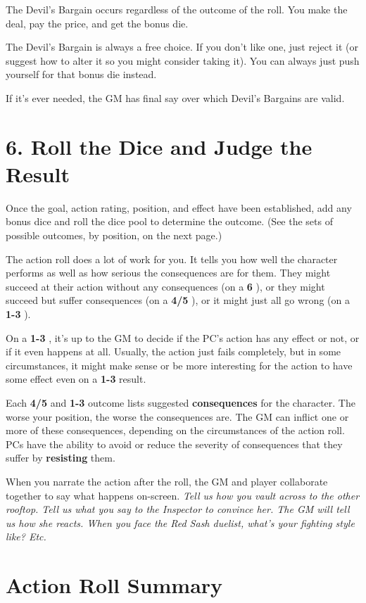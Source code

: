 \documentclass[11pt,oneside]{book}
\newcommand{\gameterm}[1]{\textbf{#1}}
\begin{document}
The Devil’s Bargain occurs regardless of the outcome of the roll. You make the deal, pay the price, and get the bonus die.

The Devil’s Bargain is always a free choice. If you don’t like one, just reject it (or suggest how to alter it so you might consider taking it). You can always just push yourself for that bonus die instead.

If it’s ever needed, the GM has final say over which Devil’s Bargains are valid.

\section{6. Roll the Dice and Judge the Result}

Once the goal, action rating, position, and effect have been established, add any bonus dice and roll the dice pool to determine the outcome. (See the sets of possible outcomes, by position, on the next page.)

The action roll does a lot of work for you. It tells you how well the character performs as well as how serious the consequences are for them. They might succeed at their action without any consequences (on a \gameterm{6} ), or they might succeed but suffer consequences (on a \gameterm{4/5} ), or it might just all go wrong (on a \gameterm{1-3} ).

On a \gameterm{1-3} , it’s up to the GM to decide if the PC’s action has any effect or not, or if it even happens at all. Usually, the action just fails completely, but in some circumstances, it might make sense or be more interesting for the action to have some effect even on a \gameterm{1-3}  result.

Each \gameterm{4/5}  and \gameterm{1-3}  outcome lists suggested \textbf{consequences} for the character. The worse your position, the worse the consequences are. The GM can inflict one or more of these consequences, depending on the circumstances of the action roll. PCs have the ability to avoid or reduce the severity of consequences that they suffer by \textbf{resisting} them.

When you narrate the action after the roll, the GM and player collaborate together to say what happens on-screen. \emph{Tell us how you vault across to the other rooftop. Tell us what you say to the Inspector to convince her. The GM will tell us how she reacts. When you face the Red Sash duelist, what’s your fighting style like? Etc.}

\section{Action Roll Summary}
\end{document}
